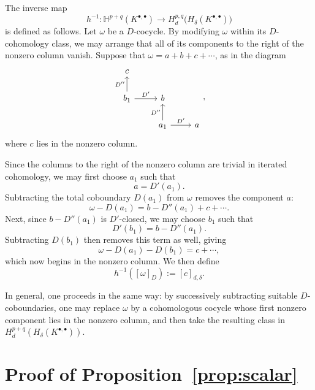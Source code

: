 \documentclass[dvipsnames,11pt]{article}
\theoremstyle{definition}
\begin{document}
\begin{appendices}
The inverse map
\[
h^{-1}: \mathbb H^{p+q}(K^{\bullet,\bullet}) \rightarrow H_d^{p,q}\bigl(H_\delta(K^{\bullet,\bullet})\bigr)
\]
is defined as follows. Let $\omega$ be a $D$-cocycle. By modifying $\omega$ within its $D$-cohomology class, we may arrange that all of its components to the right of the nonzero column vanish. Suppose that $\omega=a+b+c+\cdots$, as in the diagram
\[
\begin{tikzcd}
  c && \\
b_1 \arrow[r,"{D'}"] \arrow[u,"{D''}"] & b & \\
& a_1 \arrow[u,"{D''}"] \arrow[r,"{D'}"] & a
\end{tikzcd},
\]
where $c$ lies in the nonzero column.

Since the columns to the right of the nonzero column are trivial in iterated cohomology, we may first choose $a_1$ such that
\[
a=D'(a_1).
\]
Subtracting the total coboundary $D(a_1)$ from $\omega$ removes the component $a$:
\[
\omega-D(a_1)= b-D''(a_1)+c+\cdots .
\]
Next, since \(b-D''(a_1)\) is \(D'\)-closed, we may choose \(b_1\) such that
\[
D'(b_1)=b-D''(a_1).
\]
Subtracting \(D(b_1)\) then removes this term as well, giving
\[
\omega-D(a_1)-D(b_1)=c+\cdots ,
\]
which now begins in the nonzero column. We then define
\[
h^{-1}([\omega]_D):=[c]_{d,\delta}.
\]

In general, one proceeds in the same way: by successively subtracting suitable \(D\)-coboundaries, one may replace \(\omega\) by a cohomologous cocycle whose first nonzero component lies in the nonzero column, and then take the resulting class in \(H_d^{p+q}(H_\delta(K^{\bullet,\bullet}))\).

\section{Proof of Proposition~\ref{prop:scalar}}\label{app:prop:scalar}


\end{appendices}
\end{document}
